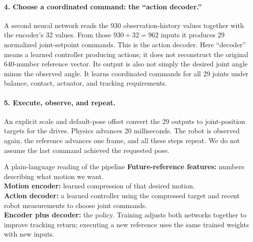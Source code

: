 \documentclass[11pt,a4paper]{article}
\begin{document}
\paragraph{4. Choose a coordinated command: the ``action decoder.''}
A second neural network reads the 930 observation-history values together with
the encoder's 32 values. From those $930+32=962$ inputs it produces 29 normalized
joint-setpoint commands. This is the action decoder. Here ``decoder'' means a
learned controller producing actions; it does not reconstruct the original
640-number reference vector. Its output is also not simply the desired joint
angle minus the observed angle. It learns coordinated commands for all 29
joints under balance, contact, actuator, and tracking requirements.

\paragraph{5. Execute, observe, and repeat.}
An explicit scale and default-pose offset convert the 29 outputs to joint-position
targets for the drives. Physics advances 20 milliseconds. The robot is observed
again, the reference advances one frame, and all these steps repeat. We do not
assume the last command achieved the requested pose.

\begin{idea}{A plain-language reading of the pipeline}
\textbf{Future-reference features:} numbers describing what motion we want.\\
\textbf{Motion encoder:} learned compression of that desired motion.\\
\textbf{Action decoder:} a learned controller using the compressed target and
recent robot measurements to choose joint commands.\\
\textbf{Encoder plus decoder:} the policy. Training adjusts both networks
together to improve tracking return; executing a new reference uses the same
trained weights with new inputs.
\end{idea}
\end{document}
